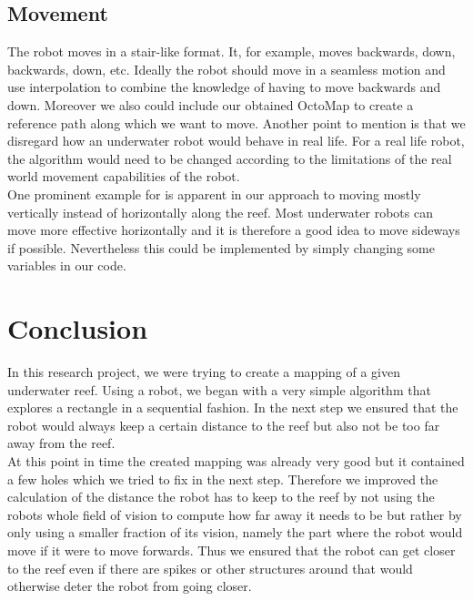 \documentclass[twoside, 12pt]{article}
\begin{document}
\subsection{Movement}
The robot moves in a stair-like format. It, for example, moves backwards, down, backwards, down, etc. Ideally the robot should move in a seamless motion and use interpolation to combine the knowledge of having to move backwards and down. Moreover we also could include our obtained OctoMap to create a reference path along which we want to move. Another point to mention is that we disregard how an underwater robot would behave in real life. For a real life robot, the algorithm would need to be changed according to the limitations of the real world movement capabilities of the robot. \\

One prominent example for is apparent in our approach to moving mostly vertically instead of horizontally along the reef. Most underwater robots can move more effective horizontally and it is therefore a good idea to move sideways if possible. Nevertheless this could be implemented by simply changing some variables in our code.\\ 

\section{Conclusion}
\label{sec:conclusion}

In this research project, we were trying to create a mapping of a given underwater reef. Using a robot, we began with a very simple algorithm that explores a rectangle in a sequential fashion. In the next step we ensured that the robot would always keep a certain distance to the reef but also not be too far away from the reef.\\

At this point in time the created mapping was already very good but it contained a few holes which we tried to fix in the next step. Therefore we improved the calculation of the distance the robot has to keep to the reef by not using the robots whole field of vision to compute how far away it needs to be but rather by only using a smaller fraction of its vision, namely the part where the robot would move if it were to move forwards. Thus we ensured that the robot can get closer to the reef even if there are spikes or other structures around that would otherwise deter the robot from going closer.\\
\end{document}
